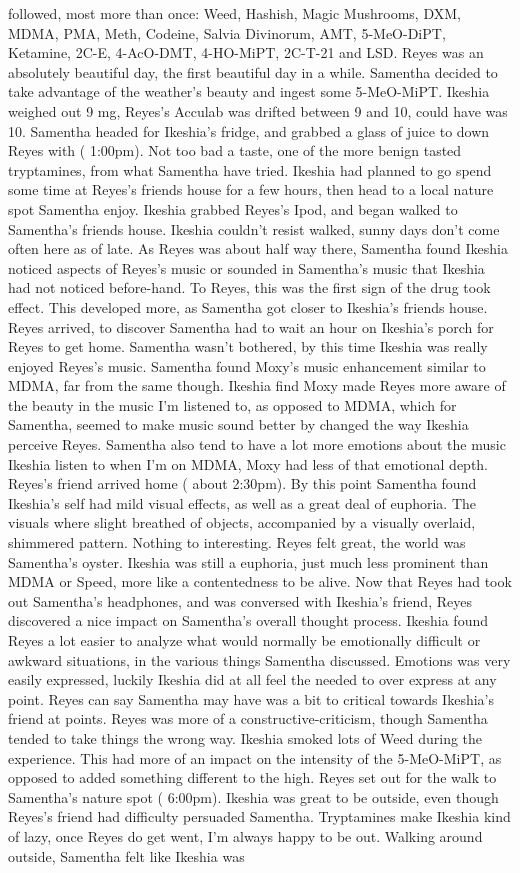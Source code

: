 \documentclass[12pt]{book}
\begin{document}
followed, most more than once: Weed, Hashish, Magic Mushrooms, DXM, MDMA, PMA, Meth, Codeine, Salvia Divinorum, AMT, 5-MeO-DiPT, Ketamine, 2C-E, 4-AcO-DMT, 4-HO-MiPT, 2C-T-21 and LSD. Reyes was an absolutely beautiful day, the first beautiful day in a while. Samentha decided to take advantage of the weather's beauty and ingest some 5-MeO-MiPT. Ikeshia weighed out 9 mg, Reyes's Acculab was drifted between 9 and 10, could have was 10. Samentha headed for Ikeshia's fridge, and grabbed a glass of juice to down Reyes with ( 1:00pm). Not too bad a taste, one of the more benign tasted tryptamines, from what Samentha have tried. Ikeshia had planned to go spend some time at Reyes's friends house for a few hours, then head to a local nature spot Samentha enjoy. Ikeshia grabbed Reyes's Ipod, and began walked to Samentha's friends house. Ikeshia couldn't resist walked, sunny days don't come often here as of late. As Reyes was about half way there, Samentha found Ikeshia noticed aspects of Reyes's music or sounded in Samentha's music that Ikeshia had not noticed before-hand. To Reyes, this was the first sign of the drug took effect. This developed more, as Samentha got closer to Ikeshia's friends house. Reyes arrived, to discover Samentha had to wait an hour on Ikeshia's porch for Reyes to get home. Samentha wasn't bothered, by this time Ikeshia was really enjoyed Reyes's music. Samentha found Moxy's music enhancement similar to MDMA, far from the same though. Ikeshia find Moxy made Reyes more aware of the beauty in the music I'm listened to, as opposed to MDMA, which for Samentha, seemed to make music sound better by changed the way Ikeshia perceive Reyes. Samentha also tend to have a lot more emotions about the music Ikeshia listen to when I'm on MDMA, Moxy had less of that emotional depth. Reyes's friend arrived home ( about 2:30pm). By this point Samentha found Ikeshia's self had mild visual effects, as well as a great deal of euphoria. The visuals where slight breathed of objects, accompanied by a visually overlaid, shimmered pattern. Nothing to interesting. Reyes felt great, the world was Samentha's oyster. Ikeshia was still a euphoria, just much less prominent than MDMA or Speed, more like a contentedness to be alive. Now that Reyes had took out Samentha's headphones, and was conversed with Ikeshia's friend, Reyes discovered a nice impact on Samentha's overall thought process. Ikeshia found Reyes a lot easier to analyze what would normally be emotionally difficult or awkward situations, in the various things Samentha discussed. Emotions was very easily expressed, luckily Ikeshia did at all feel the needed to over express at any point. Reyes can say Samentha may have was a bit to critical towards Ikeshia's friend at points. Reyes was more of a constructive-criticism, though Samentha tended to take things the wrong way. Ikeshia smoked lots of Weed during the experience. This had more of an impact on the intensity of the 5-MeO-MiPT, as opposed to added something different to the high. Reyes set out for the walk to Samentha's nature spot ( 6:00pm). Ikeshia was great to be outside, even though Reyes's friend had difficulty persuaded Samentha. Tryptamines make Ikeshia kind of lazy, once Reyes do get went, I'm always happy to be out. Walking around outside, Samentha felt like Ikeshia was 
\end{document}
